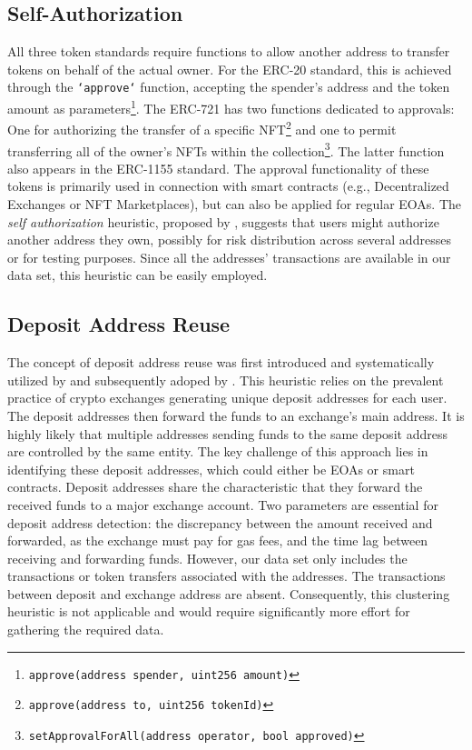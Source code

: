 \documentclass[12pt,a4paper,titlepage,oneside,english]{article}
\begin{document}
\subsection{Self-Authorization} 
	All three token standards require functions to allow another address to transfer tokens on behalf of the actual owner. For the ERC-20 standard, this is achieved through the \texttt{`approve`} function, accepting the spender's address and the token amount as parameters\footnote{\texttt{approve(address spender, uint256 amount)}}. The ERC-721 has two functions dedicated to approvals: One for authorizing the transfer of a specific NFT\footnote{\texttt{approve(address to, uint256 tokenId)}} and one to permit transferring all of the owner's NFTs within the collection\footnote{\texttt{setApprovalForAll(address operator, bool approved)}}. The latter function also appears in the ERC-1155 standard. The approval functionality of these tokens is primarily used in connection with smart contracts (e.g., Decentralized Exchanges or NFT Marketplaces), but can also be applied for regular EOAs. \newline
The \textit{self authorization} heuristic, proposed by \cite{FV:17}, suggests that users might authorize another address they own, possibly for risk distribution across several addresses or for testing purposes. Since all the addresses' transactions are available in our data set, this heuristic can be easily employed.

\subsection{Deposit Address Reuse}
The concept of deposit address reuse was first introduced and systematically utilized by \cite{FV:17} and subsequently adoped by \cite{wu2022tutela}. This heuristic relies on the prevalent practice of crypto exchanges generating unique deposit addresses for each user. The deposit addresses then forward the funds to an exchange's main address. It is highly likely that multiple addresses sending funds to the same deposit address are controlled by the same entity. The key challenge of this approach lies in identifying these deposit addresses, which could either be EOAs or smart contracts. \citep{FV:17}\newline
Deposit addresses share the characteristic that they forward the received funds to a major exchange account. Two parameters are essential for deposit address detection: the discrepancy between the amount received and forwarded, as the exchange must pay for gas fees, and the time lag between receiving and forwarding funds.
However, our data set only includes the transactions or token transfers associated with the addresses. The transactions between deposit and exchange address are absent. Consequently, this clustering heuristic is not applicable and would require significantly more effort for gathering the required data.
\end{document}
